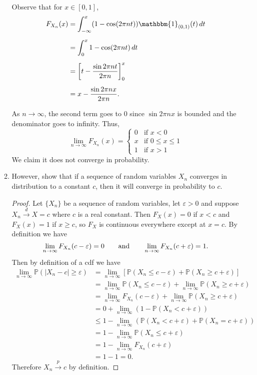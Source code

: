 \documentclass[11pt,oneside,english]{amsart}
\theoremstyle{definition}
\newcommand{\aspace}{\hspace{7mm}\text{and}\hspace{7mm}}
\newcommand{\ve}{\varepsilon}
\newcommand{\1}{\mathbbm{1}}
\newcommand{\p}{\mathbb{P}}
\begin{document}
\begin{enumerate}[leftmargin=*]
\begin{enumerate}
Observe that for $x\in[0,1]$,
\begin{align*}
F_{X_n}(x)&=\int_{-\infty}^x(1-\cos(2\pi nt))\1_{(0,1)}(t)\,dt\\[2mm]
&=\int_0^x1-\cos(2\pi nt)\,dt\\[2mm]
&=\left[t-\frac{\sin2\pi nt}{2\pi n}\right]_0^x\\[2mm]
&=x-\frac{\sin2\pi nx}{2\pi n}.
\end{align*}

As $n\to\infty$, the second term goes to 0 since $\sin 2\pi nx$ is bounded and the denominator goes to infinity. Thus, 
\[
\lim_{n\to\infty}F_{X_n}(x)=\begin{cases}0 & \text{if }x<0 \\ x & \text{if } 0\leq x\leq 1 \\ 1 & \text{if }x>1\end{cases}
\]
We claim it does not converge in probability.

\item However, show that if a sequence of random variables $X_n$ converges in distribution to a constant $c$, then it will converge in probability to $c$.

\begin{proof}
Let $\{X_n\}$ be a sequence of random variables, let $\ve>0$ and suppose $X_n \xrightarrow{d} X=c$ where $c$ is a real constant. Then $F_X(x)=0$ if $x<c$ and $F_X(x)=1$ if $x\geq c$, so $F_X$ is continuous everywhere except at $x=c$. By definition we have
\[
\lim_{n\to\infty} F_{X_n}(c-\ve)=0\aspace \lim_{n\to\infty} F_{X_n}(c+\ve)=1.
\]
Then by definition of a cdf we have
\begin{align*}
\lim_{n\to\infty}\p(|X_n-c|\geq \ve)&=\lim_{n\to\infty}\left[\p(X_n\leq c-\ve) + \p(X_n\geq c+\ve)\right]\\[2mm]
&=\lim_{n\to\infty}\p(X_n\leq c-\ve) + \lim_{n\to\infty}\p(X_n\geq c+\ve)\\[2mm]
&=\lim_{n\to\infty}F_{X_n}(c-\ve)+\lim_{n\to\infty}\p(X_n\geq c+\ve)\\[2mm]
&=0+\lim_{n\to\infty}(1-\p(X_n<c+\ve))\\[2mm]
&\leq1-\lim_{n\to\infty}\left(\p(X_n<c+\ve)+\p(X_n=c+\ve)\right)\\[2mm]
&=1-\lim_{n\to\infty}\p(X_n\leq c+\ve)\\[2mm]
&=1-\lim_{n\to\infty}F_{X_n}(c+\ve)\\[2mm]
&=1-1=0.
\end{align*}
Therefore $X_n \xrightarrow{p} c$ by definition.
\end{proof}


\end{enumerate}
\end{enumerate}
\end{document}
